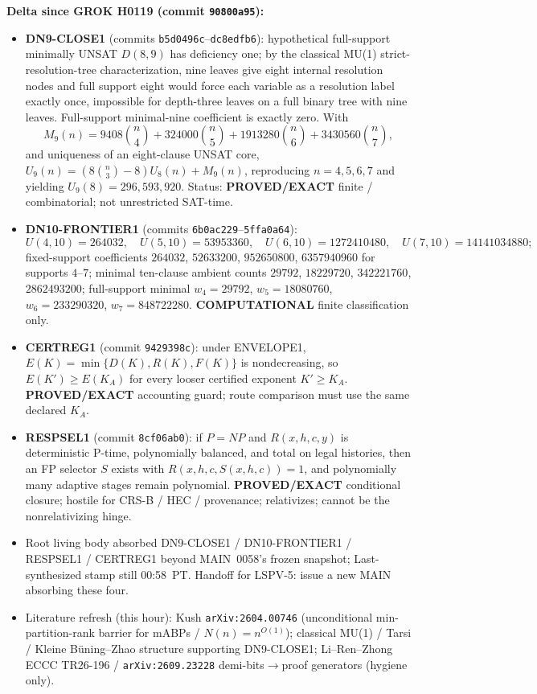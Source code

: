 \documentclass[11pt]{article}
\begin{document}
\textbf{Delta since GROK H0119 (commit \texttt{90800a95}):}
\begin{itemize}
\item \textbf{DN9-CLOSE1} (commits \texttt{b5d0496c}--\texttt{dc8edfb6}):
hypothetical full-support minimally UNSAT $D(8,9)$ has deficiency one; by the
classical MU(1) strict-resolution-tree characterization, nine leaves give
eight internal resolution nodes and full support eight would force each
variable as a resolution label exactly once, impossible for depth-three leaves
on a full binary tree with nine leaves. Full-support minimal-nine coefficient
is exactly zero. With
\[
M_9(n)=9408\binom{n}{4}+324000\binom{n}{5}+1913280\binom{n}{6}+3430560\binom{n}{7},
\]
and uniqueness of an eight-clause UNSAT core,
$U_9(n)=(8\binom{n}{3}-8)U_8(n)+M_9(n)$, reproducing $n=4,5,6,7$ and yielding
$U_9(8)=296{,}593{,}920$. Status: \textbf{PROVED/EXACT} finite / combinatorial;
not unrestricted SAT-time.
\item \textbf{DN10-FRONTIER1} (commits \texttt{6b0ac229}--\texttt{5ffa0a64}):
\[
U(4,10)=264032,\quad U(5,10)=53953360,\quad
U(6,10)=1272410480,\quad U(7,10)=14141034880;
\]
fixed-support coefficients
$264032$, $52633200$, $952650800$, $6357940960$ for supports $4$--$7$;
minimal ten-clause ambient counts
$29792$, $18229720$, $342221760$, $2862493200$; full-support minimal
$w_4=29792$, $w_5=18080760$, $w_6=233290320$, $w_7=848722280$.
\textbf{COMPUTATIONAL} finite classification only.
\item \textbf{CERTREG1} (commit \texttt{9429398c}): under ENVELOPE1,
$E(K)=\min\{D(K),R(K),F(K)\}$ is nondecreasing, so $E(K')\ge E(K_A)$ for every
looser certified exponent $K'\ge K_A$. \textbf{PROVED/EXACT} accounting guard;
route comparison must use the same declared $K_A$.
\item \textbf{RESPSEL1} (commit \texttt{8cf06ab0}): if $P=NP$ and
$R(x,h,c,y)$ is deterministic P-time, polynomially balanced, and total on legal
histories, then an FP selector $S$ exists with $R(x,h,c,S(x,h,c))=1$, and
polynomially many adaptive stages remain polynomial. \textbf{PROVED/EXACT}
conditional closure; hostile for CRS-B / HEC / provenance; relativizes; cannot
be the nonrelativizing hinge.
\item Root living body absorbed DN9-CLOSE1 / DN10-FRONTIER1 / RESPSEL1 /
CERTREG1 beyond MAIN~0058's frozen snapshot; Last-synthesized stamp still
00:58~PT. Handoff for LSPV-5: issue a new MAIN absorbing these four.
\item Literature refresh (this hour): Kush \texttt{arXiv:2604.00746}
(unconditional min-partition-rank barrier for mABPs / $N(n)=n^{O(1)}$);
classical MU(1) / Tarsi / Kleine B\"uning--Zhao structure supporting DN9-CLOSE1;
Li--Ren--Zhong ECCC TR26-196 / \texttt{arXiv:2609.23228} demi-bits$\to$proof
generators (hygiene only).
\end{itemize}
\end{document}
